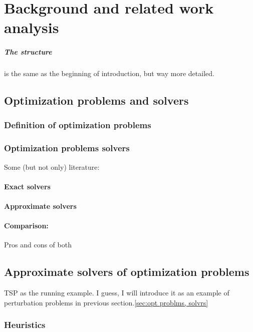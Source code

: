 \chapter{Background and related work analysis}\label{bg}
\paragraph{The structure} is the same as the beginning of introduction, but way more detailed.  


\section{Optimization problems and solvers}\label{bg:opt problems and solvers}

\subsection{Definition of optimization problems}


\subsection{Optimization problems solvers}
Some (but not only) literature: \cite{bergstra2011algorithms}
\subsubsection{Exact solvers}
\subsubsection{Approximate solvers}
\subsubsection{Comparison:} Pros and cons of both \cite{hromkovivc2013algorithmics}


\section{Approximate solvers of optimization problems}
TSP as the running example. I guess, I will introduce it as an example of perturbation problems in previous section.\ref{sec:opt problms, solvrs}

\subsection{Heuristics}

